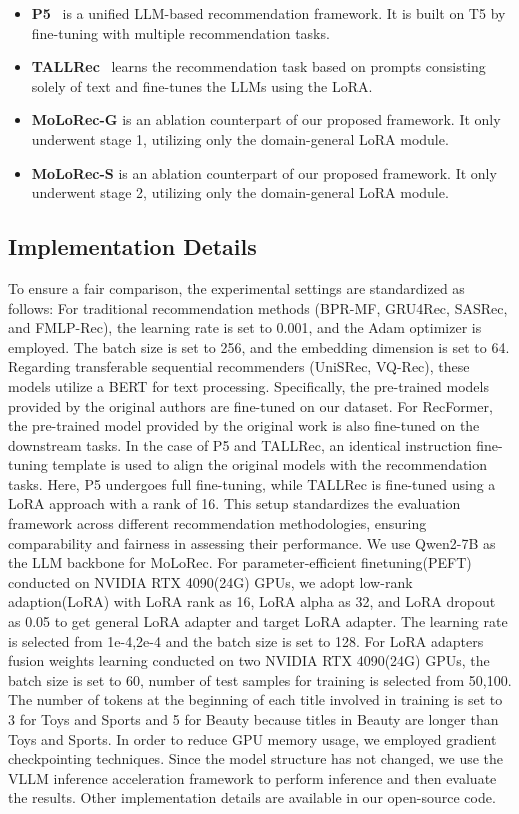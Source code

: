\begin{itemize}[leftmargin=*]
    \item \textbf{P5}~\cite{geng2022recommendation} is a unified LLM-based recommendation framework. It is built on T5 by fine-tuning with multiple recommendation tasks.
    \item \textbf{TALLRec}~\cite{bao2023tallrec} learns the recommendation task based on prompts consisting solely of text and fine-tunes the LLMs using the LoRA.
    \item \textbf{MoLoRec-G} is an ablation counterpart of our proposed framework. It only underwent stage 1, utilizing only the domain-general LoRA module.
    \item \textbf{MoLoRec-S} is an ablation counterpart of our proposed framework. It only underwent stage 2, utilizing only the domain-general LoRA module.
\end{itemize}

\subsection{Implementation Details}
\label{sec:appendix_implementation}
To ensure a fair comparison, the experimental settings are standardized as follows:
For traditional recommendation methods (BPR-MF, GRU4Rec, SASRec, and FMLP-Rec), the learning rate is set to 0.001, and the Adam optimizer is employed. The batch size is set to 256, and the embedding dimension is set to 64.
Regarding transferable sequential recommenders (UniSRec, VQ-Rec), these models utilize a BERT for text processing. Specifically, the pre-trained models provided by the original authors are fine-tuned on our dataset. For RecFormer, the pre-trained model provided by the original work is also fine-tuned on the downstream tasks.
In the case of P5 and TALLRec, an identical instruction fine-tuning template is used to align the original models with the recommendation tasks. Here, P5 undergoes full fine-tuning, while TALLRec is fine-tuned using a LoRA approach with a rank of 16.
This setup standardizes the evaluation framework across different recommendation methodologies, ensuring comparability and fairness in assessing their performance.
We use Qwen2-7B as the LLM backbone for MoLoRec. For parameter-efficient finetuning(PEFT) conducted on  NVIDIA RTX 4090(24G) GPUs, we adopt low-rank adaption(LoRA) with LoRA rank as 16, LoRA alpha as 32, and LoRA dropout as 0.05 to get general LoRA adapter and target LoRA adapter. The learning rate is selected from {1e-4,2e-4} and the batch size is set to 128. For LoRA adapters fusion weights learning conducted on two NVIDIA RTX 4090(24G) GPUs, the batch size is set to 60, number of test samples for training is selected from {50,100}. The number of tokens at the beginning of each title involved in training is set to 3 for Toys and Sports and 5 for Beauty because titles in Beauty are longer than Toys and Sports. In order to reduce GPU memory usage, we employed gradient checkpointing techniques. Since the model structure has not changed, we use the VLLM inference acceleration framework to perform inference and then evaluate the results. Other implementation details are available in our open-source code.

